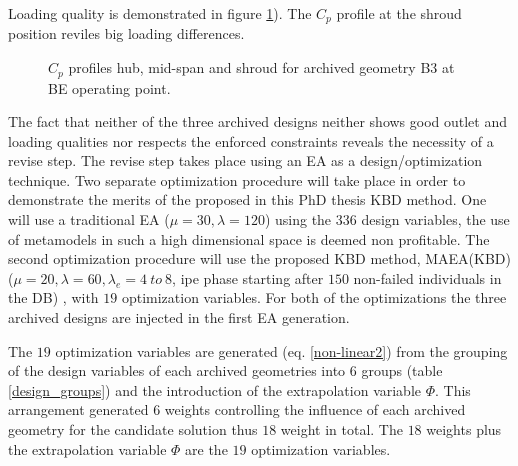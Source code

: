Loading quality is demonstrated in figure \ref{Francis-B3-LOAD}). The $C_p$ profile at the shroud position reviles big loading differences. 

\begin{figure}[h!]
\begin{minipage}[b]{1\linewidth}
 \centering
\end{minipage}
\caption{$C_p$ profiles hub, mid-span and shroud for archived geometry B3 at BE operating point.}
\label{Francis-B3-LOAD}
\end{figure}

The fact that neither of the three archived designs neither shows good outlet and loading qualities nor respects the enforced constraints reveals the necessity of a revise step. The revise step takes place using an EA as a design/optimization technique. Two separate optimization procedure will take place in order to demonstrate the merits of the proposed in this PhD thesis KBD method. One will use a traditional EA ($\mu=30,\lambda=120$) using the $336$ design variables, the use of metamodels in such a high dimensional space is deemed non profitable. The second optimization procedure will use the proposed KBD method, MAEA(KBD) ($\mu=20,\lambda=60,\lambda_e= 4 ~ to~ 8$, ipe phase starting after $150$ non-failed individuals in the DB) , with $19$ optimization variables. For both of the optimizations the three archived designs are injected in the first EA generation.

The $19$ optimization variables are generated (eq. \ref{non-linear2}) from the grouping of the design variables of each archived geometries into $6$ groups (table \ref{design_groups}) and the introduction of the extrapolation variable $\Phi$. This arrangement generated $6$ weights controlling the influence of each archived geometry for the candidate solution thus $18$ weight in total. The $18$ weights plus the extrapolation variable $\Phi$ are the $19$ optimization variables.         


